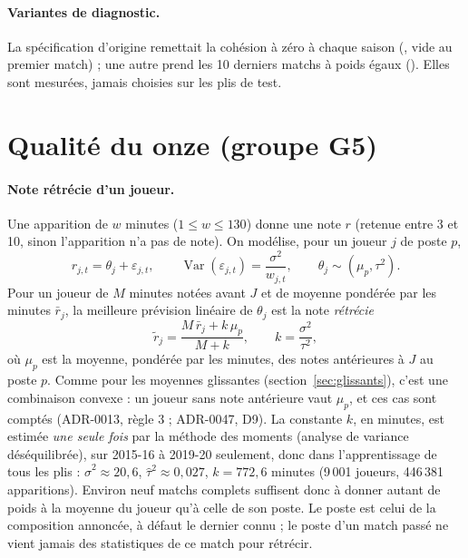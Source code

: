 \paragraph{Variantes de diagnostic.} La spécification d'origine remettait la cohésion à zéro à chaque saison
(, vide au premier match) ; une autre prend les 10 derniers matchs à poids égaux
(). Elles sont mesurées, jamais choisies sur les plis de test.

\section{Qualité du onze (groupe G5)}
\label{sec:g5}

\paragraph{Note rétrécie d'un joueur.} Une apparition de \(w\) minutes (\(1 \le w \le 130\)) donne une note
\(r\) (retenue entre 3 et 10, sinon l'apparition n'a pas de note). On modélise, pour un joueur \(j\) de poste
\(p\),
\[
  r_{j,t} = \theta_j + \varepsilon_{j,t},
  \qquad \operatorname{Var}(\varepsilon_{j,t}) = \frac{\sigma^2}{w_{j,t}},
  \qquad \theta_j \sim (\mu_p, \tau^2).
\]
Pour un joueur de \(M\) minutes notées avant \(J\) et de moyenne pondérée par les minutes \(\bar r_j\), la
meilleure prévision linéaire de \(\theta_j\) est la note \emph{rétrécie}
\[
  \tilde r_j = \frac{M\, \bar r_j + k\, \mu_p}{M + k},
  \qquad k = \frac{\sigma^2}{\tau^2},
\]
où \(\mu_p\) est la moyenne, pondérée par les minutes, des notes antérieures à \(J\) au poste \(p\). Comme
pour les moyennes glissantes (section~\ref{sec:glissants}), c'est une combinaison convexe : un joueur sans
note antérieure vaut \(\mu_p\), et ces cas sont comptés (ADR-0013, règle 3 ; ADR-0047, D9). La constante
\(k\), en minutes, est estimée \emph{une seule fois} par la méthode des moments (analyse de variance
déséquilibrée), sur 2015-16 à 2019-20 seulement, donc dans l'apprentissage de tous les plis :
\(\hat\sigma^2 \approx 20{,}6\), \(\hat\tau^2 \approx 0{,}027\), \(k = 772{,}6\) minutes (9\,001 joueurs,
446\,381 apparitions). Environ neuf matchs complets suffisent donc à donner autant de poids à la moyenne
du joueur qu'à celle de son poste. Le poste est celui de la composition annoncée, à défaut le dernier
connu ; le poste d'un match passé ne vient jamais des statistiques de ce match pour rétrécir.

